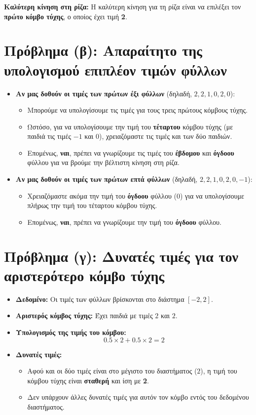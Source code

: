 \documentclass{article}
\begin{document}
\textbf{Καλύτερη κίνηση στη ρίζα:} Η καλύτερη κίνηση για τη ρίζα είναι να επιλέξει τον \textbf{πρώτο κόμβο τύχης}, ο οποίος έχει τιμή \textbf{2}.

\section*{Πρόβλημα (β): Απαραίτητο της υπολογισμού επιπλέον τιμών φύλλων}

\begin{itemize}
    \item \textbf{Αν μας δοθούν οι τιμές των πρώτων έξι φύλλων} (δηλαδή, \(2, 2, 1, 0, 2, 0\)):
    \begin{itemize}
        \item Μπορούμε να υπολογίσουμε τις τιμές για τους τρεις πρώτους κόμβους τύχης.
        \item Ωστόσο, για να υπολογίσουμε την τιμή του \textbf{τέταρτου} κόμβου τύχης (με παιδιά τις τιμές \(-1\) και \(0\)), χρειαζόμαστε τις τιμές και των δύο παιδιών.
        \item Επομένως, \textbf{ναι}, πρέπει να γνωρίζουμε τις τιμές του \textbf{έβδομου} και \textbf{όγδοου} φύλλου για να βρούμε την βέλτιστη κίνηση στη ρίζα.
    \end{itemize}

    \item \textbf{Αν μας δοθούν οι τιμές των πρώτων επτά φύλλων} (δηλαδή, \(2, 2, 1, 0, 2, 0, -1\)):
    \begin{itemize}
        \item Χρειαζόμαστε ακόμα την τιμή του \textbf{όγδοου} φύλλου (\(0\)) για να υπολογίσουμε πλήρως την τιμή του τέταρτου κόμβου τύχης.
        \item Επομένως, \textbf{ναι}, πρέπει να γνωρίζουμε την τιμή του \textbf{όγδοου} φύλλου.
    \end{itemize}
\end{itemize}

\section*{Πρόβλημα (γ): Δυνατές τιμές για τον αριστερότερο κόμβο τύχης}

\begin{itemize}
    \item \textbf{Δεδομένο:} Οι τιμές των φύλλων βρίσκονται στο διάστημα \([-2, 2]\).
    \item \textbf{Αριστερός κόμβος τύχης:} Έχει παιδιά με τιμές \(2\) και \(2\).
    \item \textbf{Υπολογισμός της τιμής του κόμβου:}
    \[
    0.5 \times 2 + 0.5 \times 2 = 2
    \]
    \item \textbf{Δυνατές τιμές:}
    \begin{itemize}
        \item Αφού και οι δύο τιμές είναι στο μέγιστο του διαστήματος (\(2\)), η τιμή του κόμβου τύχης είναι \textbf{σταθερή} και ίση με \textbf{2}.
        \item Δεν υπάρχουν άλλες δυνατές τιμές για αυτόν τον κόμβο εντός του δεδομένου διαστήματος.
    \end{itemize}
\end{itemize}
\end{document}
